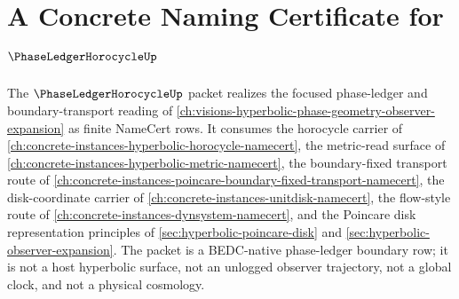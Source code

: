 \chapter{A Concrete Naming Certificate for $\PhaseLedgerHorocycleUp$}
\label{ch:concrete-instances-phase-ledger-horocycle-namecert}

The $\PhaseLedgerHorocycleUp$ packet realizes the focused phase-ledger and boundary-transport reading of \autoref{ch:visions-hyperbolic-phase-geometry-observer-expansion} as finite NameCert rows. It consumes the horocycle carrier of \autoref{ch:concrete-instances-hyperbolic-horocycle-namecert}, the metric-read surface of \autoref{ch:concrete-instances-hyperbolic-metric-namecert}, the boundary-fixed transport route of \autoref{ch:concrete-instances-poincare-boundary-fixed-transport-namecert}, the disk-coordinate carrier of \autoref{ch:concrete-instances-unitdisk-namecert}, the flow-style route of \autoref{ch:concrete-instances-dynsystem-namecert}, and the Poincare disk representation principles of \autoref{sec:hyperbolic-poincare-disk} and \autoref{sec:hyperbolic-observer-expansion}. The packet is a BEDC-native phase-ledger boundary row; it is not a host hyperbolic surface, not an unlogged observer trajectory, not a global clock, and not a physical cosmology.



